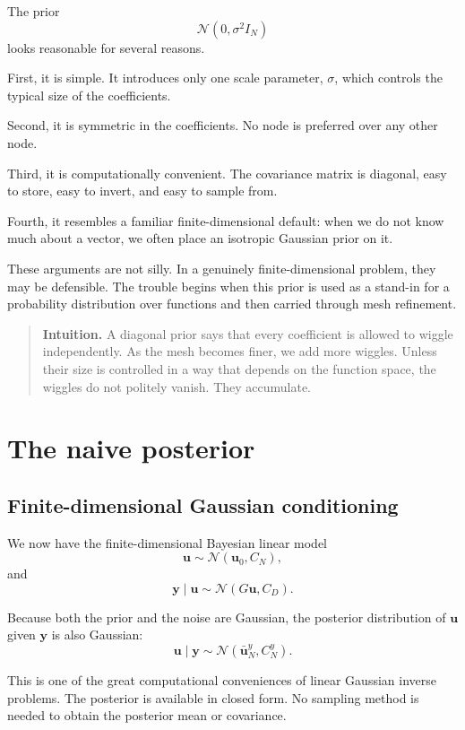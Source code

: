\documentclass[11pt,a4paper]{book}
\newenvironment{intuition}
  {\begin{quote}\textbf{Intuition.}}
  {\end{quote}}
\begin{document}
The prior
\[
    \mathcal{N}(0,\sigma^2 I_N)
\]
looks reasonable for several reasons.

First, it is simple. It introduces only one scale parameter, $\sigma$, which
controls the typical size of the coefficients.

Second, it is symmetric in the coefficients. No node is preferred over any
other node.

Third, it is computationally convenient. The covariance matrix is diagonal, easy
to store, easy to invert, and easy to sample from.

Fourth, it resembles a familiar finite-dimensional default: when we do not know
much about a vector, we often place an isotropic Gaussian prior on it.

These arguments are not silly. In a genuinely finite-dimensional problem, they
may be defensible. The trouble begins when this prior is used as a stand-in for
a probability distribution over functions and then carried through mesh
refinement.

\begin{intuition}
A diagonal prior says that every coefficient is allowed to wiggle independently.
As the mesh becomes finer, we add more wiggles. Unless their size is controlled
in a way that depends on the function space, the wiggles do not politely vanish.
They accumulate.
\end{intuition}

\section{The naive posterior}

\subsection{Finite-dimensional Gaussian conditioning}

We now have the finite-dimensional Bayesian linear model
\[
    \bm{u} \sim \mathcal{N}(\bm{u}_0,C_N),
\]
and
\[
    \bm{y}\mid \bm{u}
    \sim
    \mathcal{N}(G\bm{u},C_D).
\]

Because both the prior and the noise are Gaussian, the posterior distribution
of $\bm{u}$ given $\bm{y}$ is also Gaussian:
\[
    \bm{u}\mid \bm{y}
    \sim
    \mathcal{N}(\bar{\bm{u}}_N^y,C_N^y).
\]

This is one of the great computational conveniences of linear Gaussian inverse
problems. The posterior is available in closed form. No sampling method is
needed to obtain the posterior mean or covariance.
\end{document}
